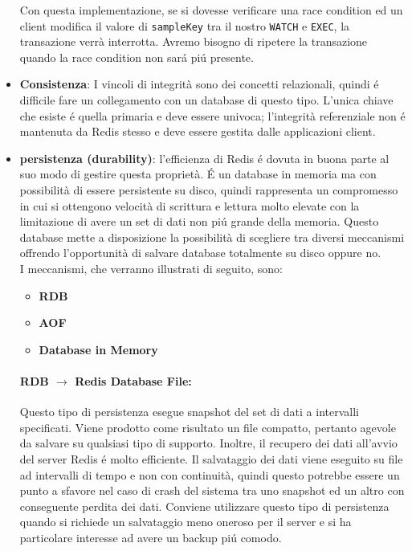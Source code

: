 \begin{itemize}
    Con questa implementazione, se si dovesse verificare una race condition ed un client modifica il valore di \texttt{sampleKey} tra il nostro
    \texttt{WATCH} e \texttt{EXEC}, la transazione verrà interrotta. Avremo bisogno di ripetere la transazione quando la race condition non sará
    piú presente.\\

    \item \textbf{Consistenza}: I vincoli di integrità sono dei concetti relazionali, quindi é difficile fare un collegamento con un database di questo tipo.
    L'unica chiave che esiste é quella primaria e deve essere univoca;
    l'integrità referenziale non é mantenuta da Redis stesso e deve essere gestita dalle applicazioni client.

    \item \textbf{persistenza (durability)}:
    l'efficienza di Redis é dovuta in buona parte al suo modo di gestire questa proprietà.
    É un database in memoria ma con possibilità di essere persistente su disco, quindi rappresenta un compromesso in cui si ottengono
    velocità di scrittura e lettura molto elevate con la limitazione di avere un set di dati non piú grande della memoria.
    Questo database mette a disposizione la possibilità di scegliere tra diversi meccanismi
    offrendo l'opportunità di salvare database
    totalmente su disco oppure no.\\
    I meccanismi, che verranno illustrati di seguito, sono:
      \begin{itemize}
          \item \textbf{RDB}
          \item \textbf{AOF}
          \item \textbf{Database in Memory}
      \end{itemize}%
        
       \paragraph{RDB $\to$ Redis Database File:}
         Questo tipo di persistenza esegue snapshot del set di dati a intervalli specificati. Viene prodotto come risultato un file
         compatto, pertanto agevole da salvare su qualsiasi tipo di supporto. Inoltre, il recupero dei dati all'avvio del server Redis
         é molto efficiente.
         Il salvataggio dei dati viene eseguito su file ad intervalli di tempo e non con continuità, quindi questo potrebbe essere un punto a sfavore
         nel caso di crash del sistema tra uno snapshot ed un altro con conseguente perdita dei dati.
         Conviene utilizzare questo tipo di persistenza quando si richiede un salvataggio meno oneroso per il server e si ha particolare interesse
         ad avere un backup piú comodo.


\end{itemize}
